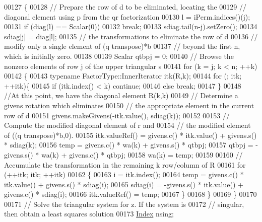 \begin{DoxyCode}
00127     \{
00128       \textcolor{comment}{// Prepare the row of d to be eliminated, locating the }
00129       \textcolor{comment}{// diagonal element using p from the qr factorization}
00130       l = iPerm.indices()(j);
00131       \textcolor{keywordflow}{if} (diag(l) == Scalar(0)) 
00132         \textcolor{keywordflow}{break}; 
00133       sdiag.tail(n-j).setZero();
00134       sdiag[j] = diag[l];
00135       \textcolor{comment}{// the transformations to eliminate the row of d}
00136       \textcolor{comment}{// modify only a single element of (q transpose)*b}
00137       \textcolor{comment}{// beyond the first n, which is initially zero. }
00138       
00139       Scalar qtbpj = 0; 
00140       \textcolor{comment}{// Browse the nonzero elements of row j of the upper triangular s}
00141       \textcolor{keywordflow}{for} (k = j; k < n; ++k)
00142       \{
00143         \textcolor{keyword}{typename} FactorType::InnerIterator itk(R,k);
00144         \textcolor{keywordflow}{for} (; itk; ++itk)\{
00145           \textcolor{keywordflow}{if} (itk.index() < k) \textcolor{keywordflow}{continue};
00146           \textcolor{keywordflow}{else} \textcolor{keywordflow}{break};
00147         \}
00148         \textcolor{comment}{//At this point, we have the diagonal element R(k,k)}
00149         \textcolor{comment}{// Determine a givens rotation which eliminates }
00150         \textcolor{comment}{// the appropriate element in the current row of d}
00151         givens.makeGivens(-itk.value(), sdiag(k));
00152         
00153         \textcolor{comment}{// Compute the modified diagonal element of r and }
00154         \textcolor{comment}{// the modified element of ((q transpose)*b,0).}
00155         itk.valueRef() = givens.c() * itk.value() + givens.s() * sdiag(k);
00156         temp = givens.c() * wa(k) + givens.s() * qtbpj; 
00157         qtbpj = -givens.s() * wa(k) + givens.c() * qtbpj;
00158         wa(k) = temp;
00159         
00160         \textcolor{comment}{// Accumulate the transformation in the remaining k row/column of R}
00161         \textcolor{keywordflow}{for} (++itk; itk; ++itk)
00162         \{
00163           i = itk.index();
00164           temp = givens.c() *  itk.value() + givens.s() * sdiag(i);
00165           sdiag(i) = -givens.s() * itk.value() + givens.c() * sdiag(i);
00166           itk.valueRef() = temp;
00167         \}
00168       \}
00169     \}
00170     
00171     \textcolor{comment}{// Solve the triangular system for z. If the system is }
00172     \textcolor{comment}{// singular, then obtain a least squares solution}
00173     \hyperlink{namespace_eigen_a62e77e0933482dafde8fe197d9a2cfde}{Index} nsing;

\end{DoxyCode}
